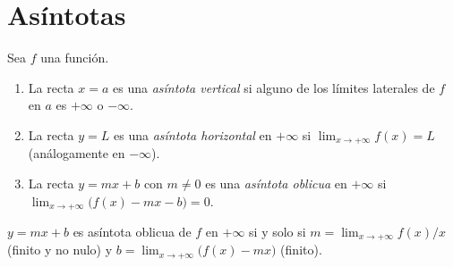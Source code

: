 \section{Asíntotas}

\begin{definicion}[Asíntotas]\label{def:asintotas}
Sea $f$ una función.
\begin{enumerate}
  \item La recta $x=a$ es una \emph{asíntota vertical} si alguno de los límites laterales de $f$ en $a$ es $+\infty$ o $-\infty$.
  \item La recta $y=L$ es una \emph{asíntota horizontal} en $+\infty$ si $\lim_{x\to+\infty}f(x)=L$ (análogamente en $-\infty$).
  \item La recta $y=mx+b$ con $m\ne0$ es una \emph{asíntota oblicua} en $+\infty$ si $\lim_{x\to+\infty}\bigl(f(x)-mx-b\bigr)=0$.
\end{enumerate}
\end{definicion}

\begin{proposicion}\label{prop:oblicua}
$y=mx+b$ es asíntota oblicua de $f$ en $+\infty$ si y solo si $m=\lim_{x\to+\infty}f(x)/x$ (finito y no nulo) y $b=\lim_{x\to+\infty}\bigl(f(x)-mx\bigr)$ (finito).
\end{proposicion}

\addtocounter{definicion}{1}%

\addtocounter{definicion}{1}%

\addtocounter{definicion}{1}%

